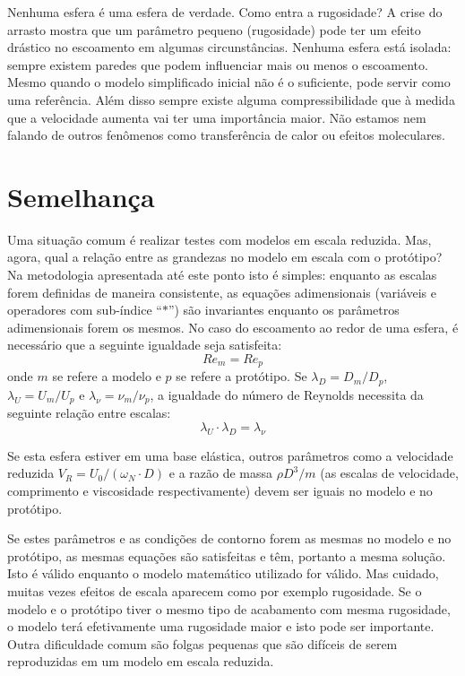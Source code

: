 Nenhuma esfera é uma esfera de verdade. Como entra a rugosidade? A crise do arrasto mostra que um parâmetro pequeno (rugosidade) pode ter um efeito drástico no escoamento em algumas circunstâncias. Nenhuma esfera está isolada: sempre existem paredes que podem influenciar mais ou menos o escoamento. Mesmo quando o modelo simplificado inicial não é o suficiente, pode servir como uma referência. Além disso sempre existe alguma compressibilidade que à medida que a velocidade aumenta vai ter uma importância maior. Não estamos nem falando de outros fenômenos como transferência de calor ou efeitos moleculares.


\section{Semelhança}

Uma situação comum é realizar testes com modelos em escala reduzida. Mas, agora, qual a relação entre as grandezas no modelo em escala com o protótipo? Na metodologia apresentada até este ponto isto é simples: enquanto as escalas forem definidas de maneira consistente, as equações adimensionais (variáveis e operadores com sub-índice ``$*$'') são invariantes enquanto os parâmetros adimensionais forem os mesmos. No caso do escoamento ao redor de uma esfera, é necessário que a seguinte igualdade seja satisfeita:
\[
Re_m = Re_p
\]
onde $m$ se refere a modelo e $p$ se refere a protótipo. Se $\lambda_D = D_m/D_p$, $\lambda_U = U_m/U_p$ e $\lambda_\nu = \nu_m/\nu_p$, a igualdade do número de Reynolds necessita da seguinte relação entre escalas:
\[
\lambda_U\cdot\lambda_D = \lambda_\nu
\]



Se esta esfera estiver em uma base elástica, outros parâmetros como a velocidade reduzida $V_R = U_0/(\omega_N\cdot D)$  e a razão de massa $\rho D^3/m$ (as escalas de velocidade, comprimento e viscosidade respectivamente) devem ser iguais no modelo e no protótipo. 

Se estes parâmetros e as condições de contorno forem as mesmas no modelo e no protótipo, as mesmas equações são satisfeitas e têm, portanto a mesma solução. Isto é válido enquanto o modelo matemático utilizado for válido. Mas cuidado, muitas vezes efeitos de escala aparecem como por exemplo rugosidade. Se o modelo e o protótipo tiver o mesmo tipo de acabamento com mesma rugosidade, o modelo terá efetivamente uma rugosidade maior e isto pode ser importante. Outra dificuldade comum são folgas pequenas que são difíceis de serem reproduzidas em um modelo em escala reduzida.

